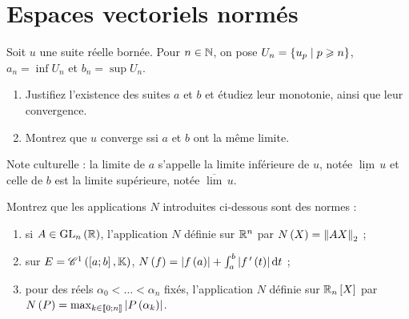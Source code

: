 \chapter{Espaces vectoriels normés}

\legendeexercices

\begin{exopss}[Exercice 1]
Soit \(u\) une suite réelle bornée. Pour \(n\in\mathbb{N}\), on pose \(U_n=\left\lbrace u_p\;\middle|\; p\geqslant n\right\rbrace\), \(a_n=\inf U_n\) et \(b_n=\sup U_n\).

\begin{enumerate}
    \item Justifiez l'existence des suites \(a\) et \(b\) et étudiez leur monotonie, ainsi que leur convergence. \\
    \item Montrez que \(u\) converge ssi \(a\) et \(b\) ont la même limite.
\end{enumerate}

Note culturelle : la limite de \(a\) s'appelle la limite inférieure de \(u\), notée \(\underline{\lim}\,u\) et celle de \(b\) est la limite supérieure, notée \(\overline{\lim}\,u\).
\end{exopss}

\begin{corr}
\end{corr}

\begin{exops}[Exercice 2]\label{exo:1.2}
Montrez que les applications \(N\) introduites ci-dessous sont des normes :

\begin{enumerate}
    \item si \(A\in\GL{n}[\R]\), l'application \(N\) définie sur \(\mathbb{R}^n\) par \(N\left(X\right)=\left\|AX\right\|_2\) ; \\
    \item sur \(E=\mathscr{C}^{1}\left(\left[a;b\right],\mathbb{K}\right)\), \(N\paren{f}=\abs{f\paren{a}}+\int_a^b\abs{f\prim\paren{t}}\odif{t}\) ; \\
    \item pour des réels \(\alpha_0<\dots<\alpha_n\) fixés, l'application \(N\) définie sur \(\polydeg[\R]{n}\) par \(N\left(P\right)=\max_{k\in\left\llbracket0;n\right\rrbracket}\left\lvert P\left(\alpha_k\right)\right\rvert\).
\end{enumerate}
\end{exops}

\begin{corr}
\end{corr}

